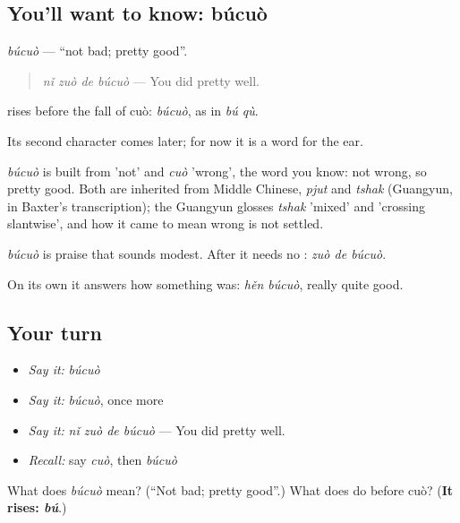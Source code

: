 \subsection*{You'll want to know: búcuò}
\emph{búcuò} — \textquotedblleft{}not bad; pretty good\textquotedblright{}.

\begin{quote}
\emph{nǐ zuò de búcuò} — You did pretty well.
\end{quote}

 rises before the fall of cuò: \emph{búcuò}, as in \emph{bú qù}.

Its second character comes later; for now it is a word for the ear.

\begin{cousinweb}
\emph{búcuò} is built from  'not' and \emph{cuò} 'wrong', the word you know: not wrong, so pretty good. Both are inherited from Middle Chinese, \emph{pjut} and \emph{tshak} (Guangyun, in Baxter's transcription); the Guangyun glosses \emph{tshak} 'mixed' and 'crossing slantwise', and how it came to mean wrong is not settled.
\end{cousinweb}

\begin{grammarlens}[title={What you've built}]
\emph{búcuò} is praise that sounds modest. After  it needs no : \emph{zuò de búcuò}.

On its own it answers how something was: \emph{hěn búcuò}, really quite good.
\end{grammarlens}

\subsection*{Your turn}
\begin{itemize}
\raggedright
  \item \emph{Say it:} \emph{búcuò}
  \item \emph{Say it:} \emph{búcuò}, once more
  \item \emph{Say it:} \emph{nǐ zuò de búcuò} — You did pretty well.
  \item \emph{Recall:} say \emph{cuò}, then \emph{búcuò}
\end{itemize}

\begin{tcolorbox}[breakable,colback=teal!4,colframe=teal!35!black,title={Before you move on}]
What does \emph{búcuò} mean? (\textquotedblleft{}Not bad; pretty good\textquotedblright{}.) What does  do before cuò? (\textbf{It rises: \emph{bú}}.)
\end{tcolorbox}
